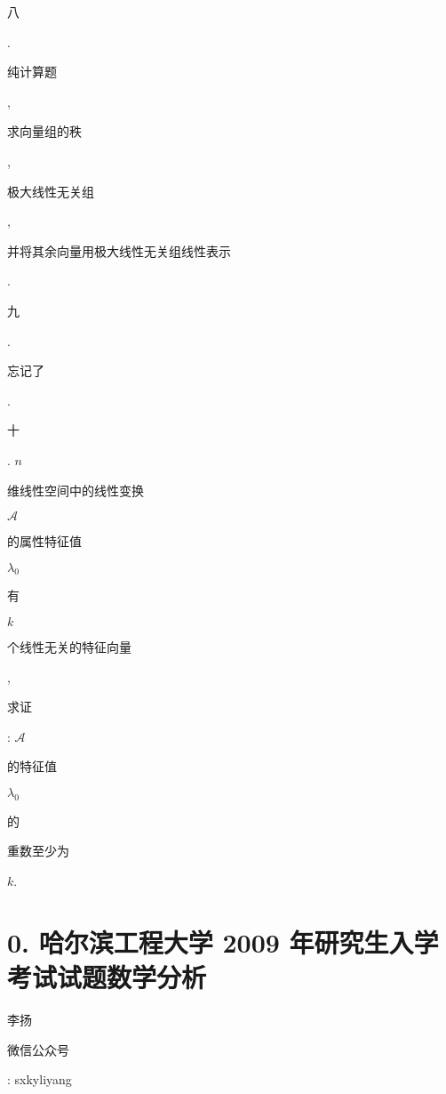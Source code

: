 \documentclass[10pt]{article}
\begin{document}
\begin{CJK}{UTF8}{mj}八\end{CJK}. \begin{CJK}{UTF8}{mj}纯计算题\end{CJK}, \begin{CJK}{UTF8}{mj}求向量组的秩\end{CJK}, \begin{CJK}{UTF8}{mj}极大线性无关组\end{CJK}, \begin{CJK}{UTF8}{mj}并将其余向量用极大线性无关组线性表示\end{CJK}.

\begin{CJK}{UTF8}{mj}九\end{CJK}. \begin{CJK}{UTF8}{mj}忘记了\end{CJK}.

\begin{CJK}{UTF8}{mj}十\end{CJK}. $n$ \begin{CJK}{UTF8}{mj}维线性空间中的线性变换\end{CJK} $\mathscr{A}$ \begin{CJK}{UTF8}{mj}的属性特征值\end{CJK} $\lambda_{0}$ \begin{CJK}{UTF8}{mj}有\end{CJK} $k$ \begin{CJK}{UTF8}{mj}个线性无关的特征向量\end{CJK}, \begin{CJK}{UTF8}{mj}求证\end{CJK}: $\mathscr{A}$ \begin{CJK}{UTF8}{mj}的特征值\end{CJK} $\lambda_{0}$ \begin{CJK}{UTF8}{mj}的\end{CJK} \begin{CJK}{UTF8}{mj}重数至少为\end{CJK} $k$.

\section{0. 哈尔滨工程大学 2009 年研究生入学考试试题数学分析}
\begin{CJK}{UTF8}{mj}李扬\end{CJK}

\begin{CJK}{UTF8}{mj}微信公众号\end{CJK}: sxkyliyang
\end{document}
